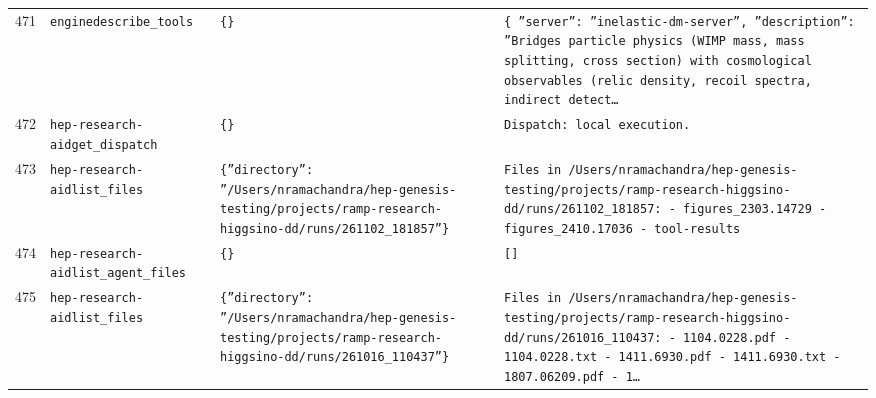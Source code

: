 \documentclass[11pt,a4paper]{article}
\begin{document}
\begin{longtable}{@{}p{}p{}p{}p{}@{}}
471 & \texttt{engine}\newline\texttt{describe\_\allowbreak{}tools} & \texttt{\{\}\allowbreak{}} & \texttt{\{   ''server'':\allowbreak{} ''inelastic-dm-server'',\allowbreak{}   ''description'':\allowbreak{} ''Bridges particle physics (WIMP mass,\allowbreak{} mass splitting,\allowbreak{} cross section)\allowbreak{} with cosmological observables (relic density,\allowbreak{} recoil spectra,\allowbreak{} indirect detect\ldots{}\allowbreak{}} \\
472 & \texttt{hep-research-aid}\newline\texttt{get\_\allowbreak{}dispatch} & \texttt{\{\}\allowbreak{}} & \texttt{Dispatch:\allowbreak{} local execution.} \\
473 & \texttt{hep-research-aid}\newline\texttt{list\_\allowbreak{}files} & \texttt{\{''directory'':\allowbreak{} ''/\allowbreak{}Users/\allowbreak{}nramachandra/\allowbreak{}hep-genesis-testing/\allowbreak{}projects/\allowbreak{}ramp-research-higgsino-dd/\allowbreak{}runs/\allowbreak{}261102\_\allowbreak{}181857''\}\allowbreak{}} & \texttt{Files in /\allowbreak{}Users/\allowbreak{}nramachandra/\allowbreak{}hep-genesis-testing/\allowbreak{}projects/\allowbreak{}ramp-research-higgsino-dd/\allowbreak{}runs/\allowbreak{}261102\_\allowbreak{}181857:\allowbreak{}   - figures\_\allowbreak{}2303.14729   - figures\_\allowbreak{}2410.17036   - tool-results} \\
474 & \texttt{hep-research-aid}\newline\texttt{list\_\allowbreak{}agent\_\allowbreak{}files} & \texttt{\{\}\allowbreak{}} & \texttt{[]\allowbreak{}} \\
475 & \texttt{hep-research-aid}\newline\texttt{list\_\allowbreak{}files} & \texttt{\{''directory'':\allowbreak{} ''/\allowbreak{}Users/\allowbreak{}nramachandra/\allowbreak{}hep-genesis-testing/\allowbreak{}projects/\allowbreak{}ramp-research-higgsino-dd/\allowbreak{}runs/\allowbreak{}261016\_\allowbreak{}110437''\}\allowbreak{}} & \texttt{Files in /\allowbreak{}Users/\allowbreak{}nramachandra/\allowbreak{}hep-genesis-testing/\allowbreak{}projects/\allowbreak{}ramp-research-higgsino-dd/\allowbreak{}runs/\allowbreak{}261016\_\allowbreak{}110437:\allowbreak{}   - 1104.0228.pdf   - 1104.0228.txt   - 1411.6930.pdf   - 1411.6930.txt   - 1807.06209.pdf   - 1\ldots{}\allowbreak{}} \\

\end{longtable}
\end{document}
